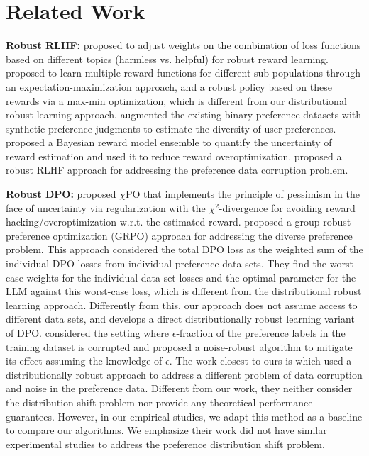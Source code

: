 \section{Related Work}

\textbf{Robust RLHF: } \citet{bai2022training} proposed to adjust weights on the combination of loss functions based on different topics (harmless vs. helpful) for robust reward learning. \citet{chakraborty2024maxmin} proposed to learn multiple reward functions for different sub-populations through an expectation-maximization approach,  and a robust policy based on these rewards via a max-min optimization, which is different from our distributional robust learning approach. \citet{padmakumar2024beyond} augmented the existing binary preference datasets with synthetic preference judgments to estimate the diversity of user preferences. \citet{yan2024reward} proposed a Bayesian reward model ensemble to quantify the uncertainty of reward estimation and used it to reduce reward overoptimization. \citet{bukharin2024robust} proposed a robust RLHF approach for addressing the preference data corruption problem. 

\textbf{Robust DPO: } \citet{huang2024correcting} proposed $\chi$PO that implements the principle of pessimism in the face of uncertainty via regularization with the $\chi^{2}$-divergence for avoiding reward hacking/overoptimization w.r.t. the estimated reward. \citet{ramesh2024group} proposed a group robust preference optimization (GRPO) approach for addressing the diverse preference problem. This approach considered the total DPO loss as the weighted sum of the individual DPO losses from individual preference data sets. They find the worst-case weights for the individual data set losses and the optimal parameter for the LLM against this worst-case loss, which is different from the distributional robust learning approach. Differently from this, our approach does not assume access to different data sets, and develops a direct distributionally robust learning variant of DPO. \citet{chowdhury2024provably} considered the setting where  $\epsilon$-fraction of the preference labels in the training dataset is corrupted and proposed a noise-robust algorithm to mitigate its effect assuming the  knowledge of $\epsilon$. The work closest to ours is \citet{wu2024towards} which used a distributionally robust approach to address a different problem of data corruption and noise in the preference data. Different from our work, they neither consider the distribution shift problem nor provide any theoretical performance guarantees. However, in our empirical studies, we adapt this method as a baseline to compare our algorithms. We emphasize their work did not have similar experimental studies to address the preference distribution shift problem. 

